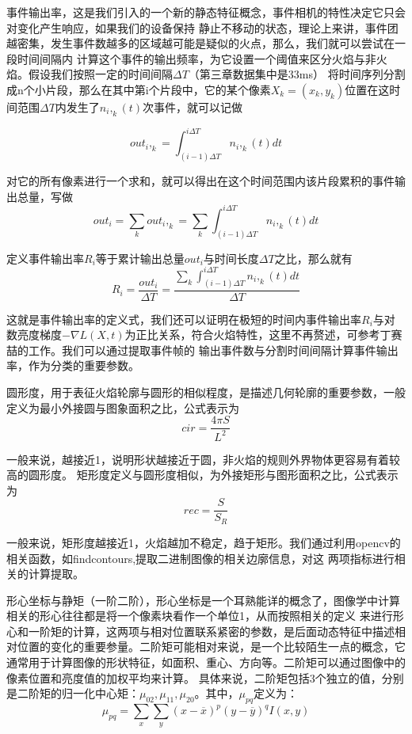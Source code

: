 事件输出率，这是我们引入的一个新的静态特征概念，事件相机的特性决定它只会对变化产生响应，如果我们的设备保持
静止不移动的状态，理论上来讲，事件团越密集，发生事件数越多的区域越可能是疑似的火点，那么，我们就可以尝试在一段时间间隔内
计算这个事件的输出频率，为它设置一个阈值来区分火焰与非火焰。假设我们按照一定的时间间隔$\Delta T$（第三章数据集中是33ms）
将时间序列分割成n个小片段，那么在其中第i个片段中，它的某个像素$X_k=(x_k,y_k)$位置在这时间范围$\Delta T$内发生了$n_i,_k(t)$次事件，就可以记做

\begin{equation} 
    out_i,_k=\int_{(i-1)\Delta T}^{i\Delta T} n_i,_k(t) dt
\end{equation}

对它的所有像素进行一个求和，就可以得出在这个时间范围内该片段累积的事件输出总量，写做
\begin{equation} 
    out_i=\sum_{k}out_i,_k=\sum_{k}\int_{(i-1)\Delta T}^{i\Delta T} n_i,_k(t) dt
\end{equation}


定义事件输出率$R_i$等于累计输出总量$out_i$与时间长度$\Delta T$之比，那么就有
\begin{equation} 
R_i=\frac{out_i}{\Delta T}=\frac{\sum_{k}\int_{(i-1)\Delta T}^{i\Delta T} n_i,_k(t) dt}{\Delta T}
\end{equation}

这就是事件输出率的定义式，我们还可以证明在极短的时间内事件输出率$R_i$与对数亮度梯度$- \nabla L(X,t)$为正比关系，符合火焰特性，这里不再赘述，可参考丁赛喆的工作\cite{ding2023}。我们可以通过提取事件帧的
输出事件数与分割时间间隔计算事件输出率，作为分类的重要参数。

圆形度，用于表征火焰轮廓与圆形的相似程度，是描述几何轮廓的重要参数，一般定义为最小外接圆与图象面积之比，公式表示为
\begin{equation} 
    cir=\frac{4\pi S}{L^2}
\end{equation}

一般来说，越接近1，说明形状越接近于圆，非火焰的规则外界物体更容易有着较高的圆形度。
矩形度定义与圆形度相似，为外接矩形与图形面积之比，公式表示为
\begin{equation} 
    rec=\frac{S}{S_R}
\end{equation}

一般来说，矩形度越接近1，火焰越加不稳定，趋于矩形。我们通过利用opencv的相关函数，如findcontours,提取二进制图像的相关边廓信息，对这
两项指标进行相关的计算提取。

形心坐标与静矩（一阶二阶），形心坐标是一个耳熟能详的概念了，图像学中计算相关的形心往往都是将一个像素块看作一个单位1，从而按照相关的定义
来进行形心和一阶矩的计算，这两项与相对位置联系紧密的参数，是后面动态特征中描述相对位置的变化的重要参量。二阶矩可能相对来说，是一个比较陌生一点的概念，它通常用于计算图像的形状特征，如面积、重心、方向等。二阶矩可以通过图像中的像素位置和亮度值的加权平均来计算。
具体来说，二阶矩包括3个独立的值，分别是二阶矩的归一化中心矩：$\mu_{02},\mu_{11},\mu_{20}$。其中，$\mu_{pq}$定义为：
\begin{equation} 
    \mu_{pq}=\sum_{x}\sum_{y}(x-\overline{x})^p(y-\overline{y})^qI(x,y)
\end{equation}

